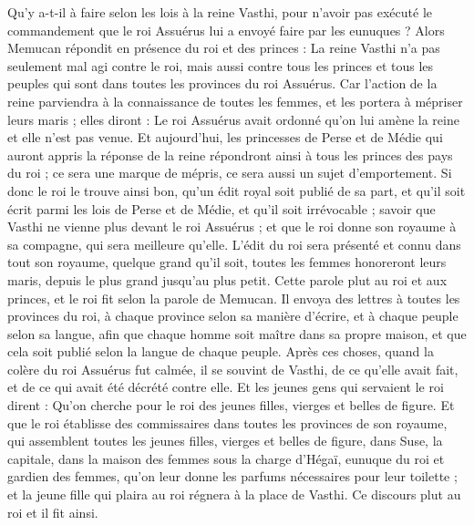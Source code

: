 \begin{multicols}{2}
Qu'y a-t-il à faire selon les lois à la reine Vasthi, pour n'avoir pas exécuté le commandement que le roi Assuérus lui a envoyé faire par les eunuques ?
Alors Memucan répondit en présence du roi et des princes : La reine Vasthi n'a pas seulement mal agi contre le roi, mais aussi contre tous les princes et tous les peuples qui sont dans toutes les provinces du roi Assuérus.
Car l'action de la reine parviendra à la connaissance de toutes les femmes, et les portera à mépriser leurs maris ; elles diront : Le roi Assuérus avait ordonné qu'on lui amène la reine et elle n'est pas venue.
Et aujourd'hui, les princesses de Perse et de Médie qui auront appris la réponse de la reine répondront ainsi à tous les princes des pays du roi ; ce sera une marque de mépris, ce sera aussi un sujet d'emportement.
Si donc le roi le trouve ainsi bon, qu'un édit royal soit publié de sa part, et qu'il soit écrit parmi les lois de Perse et de Médie, et qu'il soit irrévocable ; savoir que Vasthi ne vienne plus devant le roi Assuérus ; et que le roi donne son royaume à sa compagne, qui sera meilleure qu'elle.
L'édit du roi sera présenté et connu dans tout son royaume, quelque grand qu'il soit, toutes les femmes honoreront leurs maris, depuis le plus grand jusqu'au plus petit.
Cette parole plut au roi et aux princes, et le roi fit selon la parole de Memucan.
Il envoya des lettres à toutes les provinces du roi, à chaque province selon sa manière d'écrire, et à chaque peuple selon sa langue, afin que chaque homme soit maître dans sa propre maison, et que cela soit publié selon la langue de chaque peuple.
\VerseOne{}Après ces choses, quand la colère du roi Assuérus fut calmée, il se souvint de Vasthi, de ce qu'elle avait fait, et de ce qui avait été décrété contre elle.
Et les jeunes gens qui servaient le roi dirent : Qu'on cherche pour le roi des jeunes filles, vierges et belles de figure.
Et que le roi établisse des commissaires dans toutes les provinces de son royaume, qui assemblent toutes les jeunes filles, vierges et belles de figure, dans Suse, la capitale, dans la maison des femmes sous la charge d'Hégaï, eunuque du roi et gardien des femmes, qu'on leur donne les parfums nécessaires pour leur toilette ;
et la jeune fille qui plaira au roi régnera à la place de Vasthi. Ce discours plut au roi et il fit ainsi.

\end{multicols}
